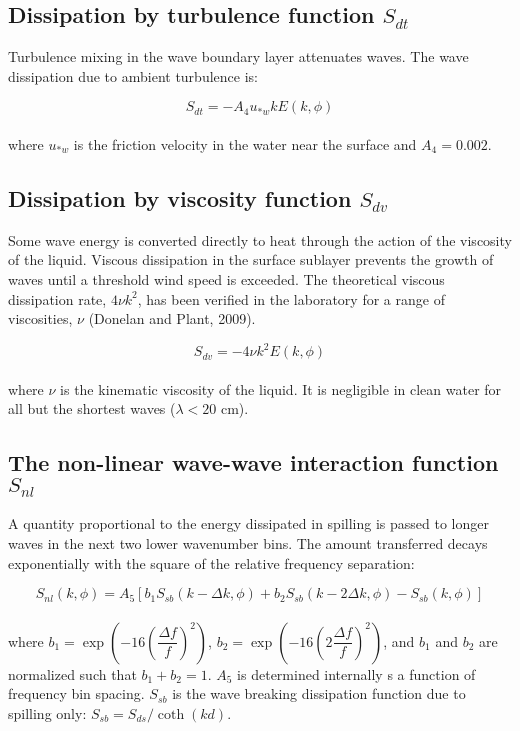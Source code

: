 \documentclass[letterpaper]{article}
\numberwithin{equation}{section}
\begin{document}
\subsection{Dissipation by turbulence function $S_{dt}$}

Turbulence mixing in the wave boundary layer attenuates waves. The wave dissipation due to ambient turbulence is:

\begin{equation}
S_{dt} = -A_{4} u_{*w}k E(k,\phi)
\label{sdt} 
\end{equation}
\\
where $u_{*w}$ is the friction velocity in the water near the surface and $A_{4} = 0.002$.

\subsection{Dissipation by viscosity function $S_{dv}$}

Some wave energy is converted directly to heat 
through the action of the viscosity of the liquid.
Viscous dissipation in the surface sublayer prevents 
the growth of waves until a threshold wind speed is exceeded.
The theoretical viscous dissipation rate, $4\nu k^{2}$, 
has been verified in the laboratory for a range of viscosities, 
$\nu$ (Donelan and Plant, 2009).

\begin{equation}
S_{dv}= -4\nu k^{2}E(k,\phi)
\label{sdv} 
\end{equation}
\\

where $\nu$ is the kinematic viscosity of the liquid. 
It is negligible in clean water for all but the shortest waves ($\lambda<20$ cm).

\subsection{The non-linear wave-wave interaction function $S_{nl}$}

A quantity proportional to the energy dissipated in spilling is passed to longer waves in the next two lower wavenumber bins. 
The amount transferred decays exponentially with the square of the relative frequency separation:

\begin{equation}
S_{nl}(k,\phi) = A_{5}\left[b_{1}S_{sb}(k-\Delta k,\phi)
                           +b_{2}S_{sb}(k-2\Delta k,\phi)
                           -S_{sb}(k,\phi)\right]
\label{snl}
\end{equation}
\\
where $b_{1}=\exp(-16(\dfrac{\Delta{f}}{f})^{2})$, $b_{2}=\exp(-16(2\dfrac{\Delta{f}}{f})^{2})$,
and $b_{1}$ and $b_{2}$ are normalized such that $b_{1}+b_{2}=1$.
$A_5$ is determined internally s a function of frequency bin spacing.
$S_{sb}$ is the wave breaking dissipation function due to spilling only: $S_{sb} = S_{ds} / \coth(kd)$.
\end{document}

